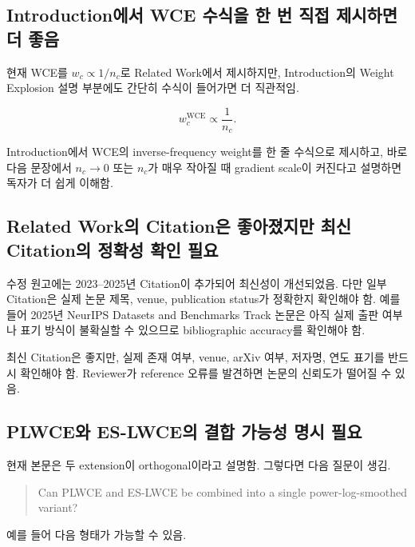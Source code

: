 \documentclass[11pt,a4paper]{article}
\begin{document}
\subsection{Introduction에서 WCE 수식을 한 번 직접 제시하면 더 좋음}

현재 WCE를 \(w_c\propto1/n_c\)로 Related Work에서 제시하지만, Introduction의 Weight Explosion 설명 부분에도 간단히 수식이 들어가면 더 직관적임.

\begin{equation}
w_c^{\mathrm{WCE}}\propto\frac{1}{n_c}.
\end{equation}

\begin{tcolorbox}[title=수정 권장]
Introduction에서 WCE의 inverse-frequency weight를 한 줄 수식으로 제시하고, 바로 다음 문장에서 \(n_c\to0\) 또는 \(n_c\)가 매우 작아질 때 gradient scale이 커진다고 설명하면 독자가 더 쉽게 이해함.
\end{tcolorbox}

\subsection{Related Work의 Citation은 좋아졌지만 최신 Citation의 정확성 확인 필요}

수정 원고에는 2023--2025년 Citation이 추가되어 최신성이 개선되었음. 다만 일부 Citation은 실제 논문 제목, venue, publication status가 정확한지 확인해야 함. 예를 들어 2025년 NeurIPS Datasets and Benchmarks Track 논문은 아직 실제 출판 여부나 표기 방식이 불확실할 수 있으므로 bibliographic accuracy를 확인해야 함.

\begin{tcolorbox}[title=수정 권장]
최신 Citation은 좋지만, 실제 존재 여부, venue, arXiv 여부, 저자명, 연도 표기를 반드시 확인해야 함. Reviewer가 reference 오류를 발견하면 논문의 신뢰도가 떨어질 수 있음.
\end{tcolorbox}

\subsection{PLWCE와 ES-LWCE의 결합 가능성 명시 필요}

현재 본문은 두 extension이 orthogonal이라고 설명함. 그렇다면 다음 질문이 생김.

\begin{quote}
Can PLWCE and ES-LWCE be combined into a single power-log-smoothed variant?
\end{quote}

예를 들어 다음 형태가 가능할 수 있음.
\end{document}
